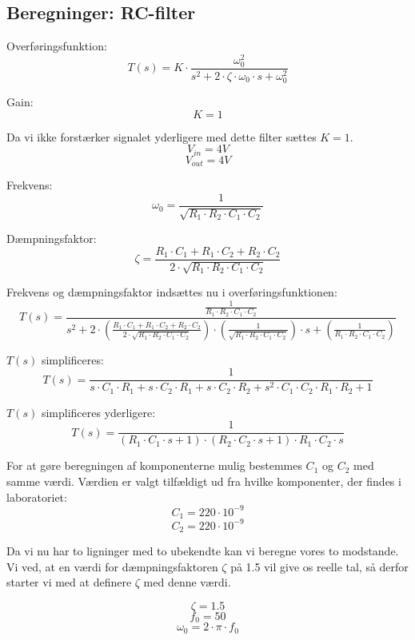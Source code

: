 \clearpage
  
\subsection{Beregninger: RC-filter} \label{RC-filter}
\vspace{0.2 cm}
Overføringsfunktion: 
\[ T(s)=K \cdot \frac{\omega_{0}^{2}}{{s^{2}+2 \cdot \zeta \cdot \omega_{0}\cdot s+\omega_{0}^{2}}} \]

Gain:
\[ K=1 \]



Da vi ikke forstærker signalet yderligere med dette filter sættes $K=1$.
\[ V_{in}=4V \]
\[ V_{out}=4V \]

Frekvens:
\[ \omega_{0}=\frac{1}{\sqrt{R_{1} \cdot R_{2} \cdot C_{1} \cdot C_{2}}} \]

Dæmpningsfaktor:
\[ \zeta= \frac{R_{1} \cdot C_{1} + R_{1} \cdot C_{2}+R_{2} \cdot C_{2}}{2 \cdot \sqrt{R_{1} \cdot R_{2} \cdot C_{1} \cdot C_{2}}} \]

Frekvens og dæmpningsfaktor indsættes nu i overføringsfunktionen:
\[ T(s)=\frac{\frac{1}{R_{1} \cdot R_{2} \cdot C_{1} \cdot C_{2}}}{s^{2}+2 \cdot (\frac{R_{1} \cdot C_{1} + R_{1} \cdot C_{2}+R_{2} \cdot C_{2}}{2 \cdot \sqrt{R_{1} \cdot R_{2} \cdot C_{1} \cdot C_{2}}}) \cdot (\frac{1}{\sqrt{R_{1} \cdot R_{2} \cdot C_{1} \cdot C_{2}}}) \cdot s + (\frac{1}{R_{1} \cdot R_{2} \cdot C_{1} \cdot C_{2}})}  \]

$T(s)$ simplificeres:
\[ T(s)=\frac{1}{s \cdot C_{1} \cdot R_{1} +s \cdot C_{2} \cdot R_{1}+s \cdot C_{2} \cdot R_{2}+s^{2}\cdot C_{1} \cdot C_{2} \cdot R_{1} \cdot R_{2} +1} \]

$T(s)$ simplificeres yderligere:
\[ T(s)=\frac{1}{(R_{1} \cdot C_{1} \cdot s+1) \cdot (R_{2} \cdot C_{2} \cdot s +1) \cdot R_{1} \cdot C_{2} \cdot s} \]

For at gøre beregningen af komponenterne mulig bestemmes $ C_{1} $ og $ C_{2} $ med samme værdi. Værdien er valgt tilfældigt ud fra hvilke komponenter, der findes i laboratoriet:
\[ C_{1} = 220 \cdot 10^{-9} \]
\[ C_{2} = 220 \cdot 10^{-9} \]

Da vi nu har to ligninger med to ubekendte kan vi beregne vores to modstande. Vi ved, at en værdi for dæmpningsfaktoren $\zeta$ på 1.5 vil give os reelle tal, så derfor starter vi med at definere $\zeta$ med denne værdi.

\clearpage
\[ \zeta = 1.5 \]
\[ f_{0} = 50 \]
\[ \omega_{0} = 2 \cdot \pi \cdot f_{0} \]

